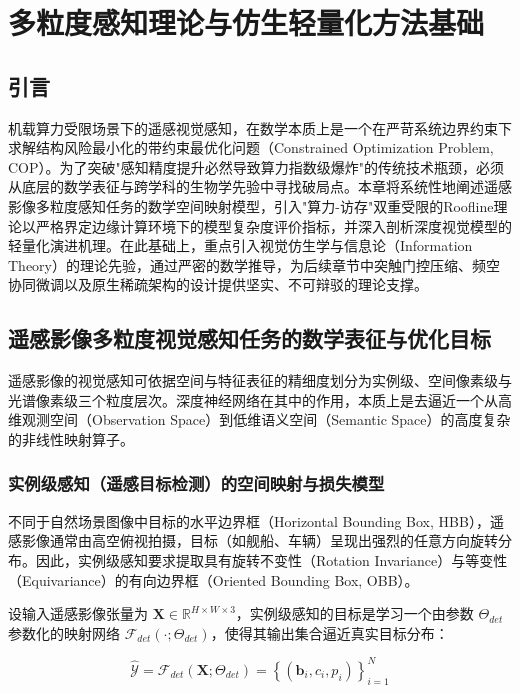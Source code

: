 \chapter{多粒度感知理论与仿生轻量化方法基础}
\label{chap:theory}

\section{引言}

机载算力受限场景下的遥感视觉感知，在数学本质上是一个在严苛系统边界约束下求解结构风险最小化的带约束最优化问题（Constrained Optimization Problem, COP）。为了突破"感知精度提升必然导致算力指数级爆炸"的传统技术瓶颈，必须从底层的数学表征与跨学科的生物学先验中寻找破局点。本章将系统性地阐述遥感影像多粒度感知任务的数学空间映射模型，引入"算力-访存"双重受限的Roofline理论以严格界定边缘计算环境下的模型复杂度评价指标，并深入剖析深度视觉模型的轻量化演进机理。在此基础上，重点引入视觉仿生学与信息论（Information Theory）的理论先验，通过严密的数学推导，为后续章节中突触门控压缩、频空协同微调以及原生稀疏架构的设计提供坚实、不可辩驳的理论支撑。

\section{遥感影像多粒度视觉感知任务的数学表征与优化目标}

遥感影像的视觉感知可依据空间与特征表征的精细度划分为实例级、空间像素级与光谱像素级三个粒度层次。深度神经网络在其中的作用，本质上是去逼近一个从高维观测空间（Observation Space）到低维语义空间（Semantic Space）的高度复杂的非线性映射算子。

\subsection{实例级感知（遥感目标检测）的空间映射与损失模型}

不同于自然场景图像中目标的水平边界框（Horizontal Bounding Box, HBB），遥感影像通常由高空俯视拍摄，目标（如舰船、车辆）呈现出强烈的任意方向旋转分布。因此，实例级感知要求提取具有旋转不变性（Rotation Invariance）与等变性（Equivariance）的有向边界框（Oriented Bounding Box, OBB）。

设输入遥感影像张量为 $\mathbf{X} \in \mathbb{R}^{H \times W \times 3}$，实例级感知的目标是学习一个由参数 $\Theta_{det}$ 参数化的映射网络 $\mathcal{F}_{det}(\cdot; \Theta_{det})$，使得其输出集合逼近真实目标分布：

\begin{equation}
\hat{\mathcal{Y}} = \mathcal{F}_{det}(\mathbf{X}; \Theta_{det}) = \left\{ (\mathbf{b}_i, c_i, p_i) \right\}_{i=1}^N
\end{equation}

